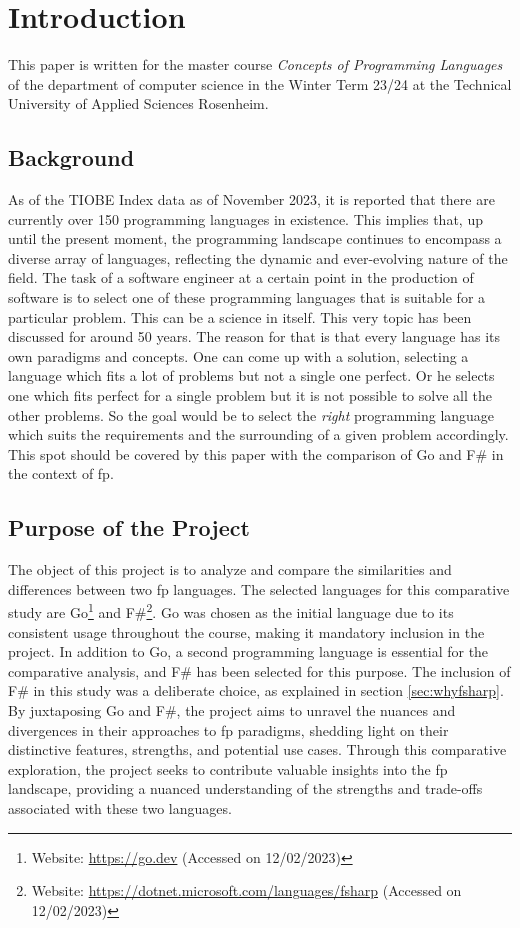 \chapter{Introduction}\label{chap:introduction}
This paper is written for the master course \textit{Concepts of Programming Languages} of the department of computer science in the Winter Term 23/24 at the Technical University of Applied Sciences Rosenheim.
    \section{Background}\label{sec:background}
As of the TIOBE Index data as of November 2023, it is reported that there are currently over 150 programming languages in existence. This implies that, up until the present moment, the programming landscape continues to encompass a diverse array of languages, reflecting the dynamic and ever-evolving nature of the field.\cite{Tiobeindex} The task of a software engineer at a certain point in the production of software is to select one of these programming languages that is suitable for a particular problem. This can be a science in itself. This very topic has been discussed for around 50 years.\cite{Tharp1982}
The reason for that is that every language has its own paradigms and concepts. One can come up with a solution, selecting a language which fits a lot of problems but not a single one perfect. Or he selects one which fits perfect for a single problem but it is not possible to solve all the other problems.
So the goal would be to select the \textit{right} programming language which suits the requirements and the surrounding of a given problem accordingly.
This spot should be covered by this paper with the comparison of Go and F\# in the context of \ac{fp}.

    \section{Purpose of the Project}\label{sec:purpose}
    The object of this project is to analyze and compare the similarities and differences between two \ac{fp} languages. The selected languages for this comparative study are Go\footnote{Website: \url{https://go.dev} (Accessed on 12/02/2023)} and F\#\footnote{Website: \url{https://dotnet.microsoft.com/languages/fsharp} (Accessed on 12/02/2023)}. Go was chosen as the initial language due to its consistent usage throughout the course, making it mandatory inclusion in the project. 
    In addition to Go, a second programming language is essential for the comparative analysis, and F\# has been selected for this purpose. The inclusion of F\# in this study was a deliberate choice, as explained in section \ref{sec:whyfsharp}. By juxtaposing Go and F\#, the project aims to unravel the nuances and divergences in their approaches to \ac{fp} paradigms, shedding light on their distinctive features, strengths, and potential use cases. Through this comparative exploration, the project seeks to contribute valuable insights into the \ac{fp} landscape, providing a nuanced understanding of the strengths and trade-offs associated with these two languages.

